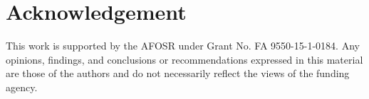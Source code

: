\documentclass[conference]{IEEEtran}
\begin{document}
\IEEEpeerreviewmaketitle










\section{Acknowledgement} 
This work is supported by the AFOSR under Grant No.
\linebreak FA 9550-15-1-0184. Any opinions, findings, and conclusions
or recommendations expressed in this material are those of
the authors and do not necessarily reflect the views of the
funding agency.




\end{document}
